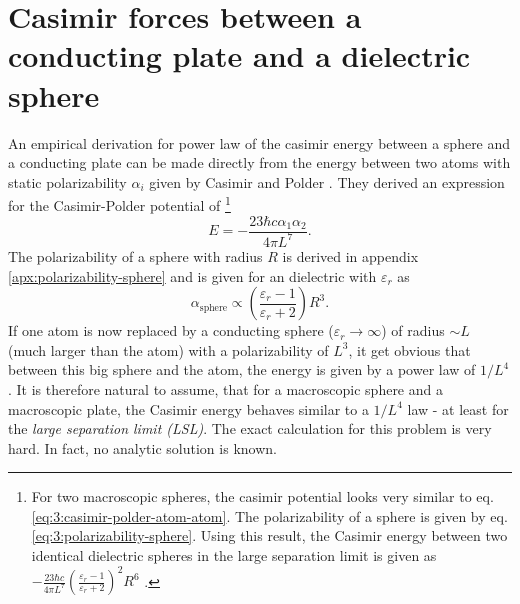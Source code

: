 \section{Casimir forces between a conducting plate and a dielectric sphere}
\label{sec:3:casimir-plate-sphere}

An empirical derivation for power law of the casimir energy between a sphere and a conducting plate can be made directly from the energy between two atoms with static polarizability $\alpha_i$ given by Casimir and Polder \cite{Casimir_1948a}. They derived an expression for the Casimir-Polder potential of \footnote{For two macroscopic spheres, the casimir potential looks very similar to eq. \eqref{eq:3:casimir-polder-atom-atom}. The polarizability of a sphere is given by eq. \eqref{eq:3:polarizability-sphere}. Using this result, the Casimir energy between two identical dielectric spheres in the large separation limit is given as $-\frac{23\hbar c}{4\pi L^7}\left(\frac{\varepsilon_r-1}{\varepsilon_r+2}\right)^2R^6$ \cite{Emig_2007}.}
\begin{equation}\label{eq:3:casimir-polder-atom-atom}
  E = -\frac{23\hbar c \alpha_1 \alpha_2}{4 \pi L^7} .
\end{equation}
The polarizability of a sphere with radius $R$ is derived in appendix \ref{apx:polarizability-sphere} and is given for an dielectric with $\varepsilon_r$ as 
\begin{equation} \label{eq:3:polarizability-sphere}
  \alpha_\mathrm{sphere} \propto \left(\frac{\varepsilon_r-1}{\varepsilon_r+2}\right)R^3 .
\end{equation}
If one atom is now replaced by a conducting sphere ($\varepsilon_r \rightarrow \infty$) of radius $\sim L$ (much larger than the atom) with a polarizability of $L^3$, it get obvious that between this big sphere and the atom, the energy is given by a power law of $1/L^4$.
It is therefore natural to assume, that for a macroscopic sphere and a macroscopic plate, the Casimir energy behaves similar to a $1/L^4$ law - at least for the \emph{large separation limit (LSL)}.
The exact calculation for this problem is very hard. In fact, no analytic solution is known.

